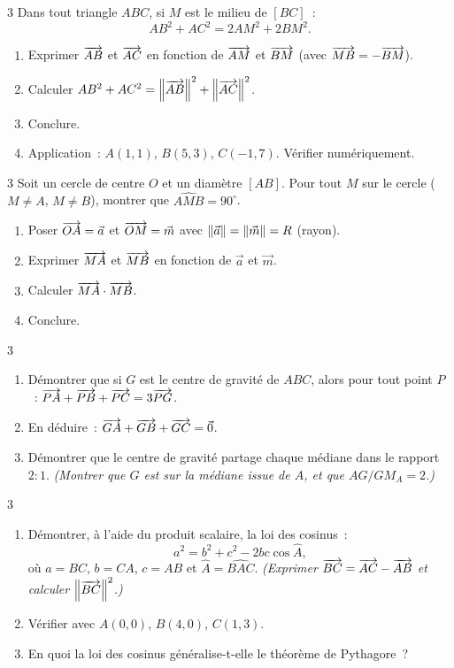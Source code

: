 \begin{exo}{3}
Dans tout triangle $ABC$, si $M$ est le milieu de $[BC]$~:
$$AB^2 + AC^2 = 2AM^2 + 2BM^2.$$
\begin{enumerate}
  \item Exprimer $\overrightarrow{AB}$ et $\overrightarrow{AC}$ en fonction de $\overrightarrow{AM}$
        et $\overrightarrow{BM}$ (avec $\overrightarrow{MB}=-\overrightarrow{BM}$).
  \item Calculer $AB^2+AC^2 = \left\|\overrightarrow{AB}\right\|^2+\left\|\overrightarrow{AC}\right\|^2$.
  \item Conclure.
  \item Application~: $A(1,1)$, $B(5,3)$, $C(-1,7)$.
        V\'erifier num\'eriquement.
\end{enumerate}
\end{exo}

\begin{exo}{3}
Soit un cercle de centre $O$ et un diam\`etre $[AB]$. Pour tout $M$
sur le cercle ($M\ne A$, $M\ne B$), montrer que $\widehat{AMB} = 90^{\circ}$.
\begin{enumerate}
  \item Poser $\overrightarrow{OA}=\vec{a}$ et $\overrightarrow{OM}=\vec{m}$
        avec $\left\|\vec{a}\right\|=\left\|\vec{m}\right\|=R$ (rayon).
  \item Exprimer $\overrightarrow{MA}$ et $\overrightarrow{MB}$ en fonction de $\vec{a}$ et $\vec{m}$.
  \item Calculer $\overrightarrow{MA}\cdot\overrightarrow{MB}$.
  \item Conclure.
\end{enumerate}
\end{exo}

\begin{exo}{3}
\begin{enumerate}
  \item D\'emontrer que si $G$ est le centre de gravité de $ABC$, alors pour tout
        point $P$~: $\overrightarrow{PA}+\overrightarrow{PB}+\overrightarrow{PC} = 3\overrightarrow{PG}$.
  \item En d\'eduire~: $\overrightarrow{GA}+\overrightarrow{GB}+\overrightarrow{GC}=\vec{0}$.
  \item D\'emontrer que le centre de gravité partage chaque m\'ediane dans le rapport $2:1$.
        \emph{(Montrer que $G$ est sur la m\'ediane issue de $A$, et que $AG/GM_A=2$.)}
\end{enumerate}
\end{exo}

\begin{exo}{3}
\begin{enumerate}
  \item D\'emontrer, \`a l'aide du produit scalaire, la loi des cosinus~:
        $$a^2 = b^2 + c^2 - 2bc\cos\widehat{A},$$
        o\`u $a=BC$, $b=CA$, $c=AB$ et $\widehat{A}=\widehat{BAC}$.
        \emph{(Exprimer $\overrightarrow{BC}=\overrightarrow{AC}-\overrightarrow{AB}$ et calculer $\left\|\overrightarrow{BC}\right\|^2$.)}
  \item V\'erifier avec $A(0,0)$, $B(4,0)$, $C(1,3)$.
  \item En quoi la loi des cosinus g\'en\'eralise-t-elle le th\'eor\`eme de Pythagore~?
\end{enumerate}
\end{exo}

